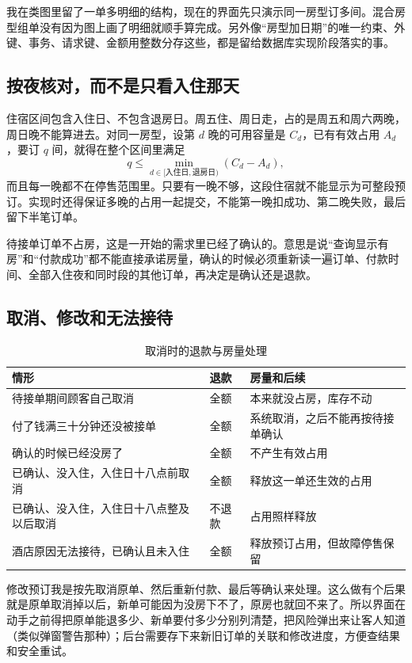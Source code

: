 \documentclass[UTF8,a4paper,zihao=-4,fontset=none]{ctexart}
\begin{document}
我在类图里留了一单多明细的结构，现在的界面先只演示同一房型订多间。混合房型组单没有因为图上画了明细就顺手算完成。另外像“房型加日期”的唯一约束、外键、事务、请求键、金额用整数分存这些，都是留给数据库实现阶段落实的事。

\subsection{按夜核对，而不是只看入住那天}
住宿区间包含入住日、不包含退房日。周五住、周日走，占的是周五和周六两晚，周日晚不能算进去。对同一房型，设第 $d$ 晚的可用容量是 $C_d$，已有有效占用 $A_d$，要订 $q$ 间，就得在整个区间里满足
\[
q\leq\min_{d\in[\text{入住日},\text{退房日})}(C_d-A_d),
\]
而且每一晚都不在停售范围里。只要有一晚不够，这段住宿就不能显示为可整段预订。实现时还得保证多晚的占用一起提交，不能第一晚扣成功、第二晚失败，最后留下半笔订单。

待接单订单不占房，这是一开始的需求里已经了确认的。意思是说“查询显示有房”和“付款成功”都不能直接承诺房量，确认的时候必须重新读一遍订单、付款时间、全部入住夜和同时段的其他订单，再决定是确认还是退款。

\subsection{取消、修改和无法接待}
\begin{table}[H]\centering\small
\caption{取消时的退款与房量处理}
\begin{tabularx}{\linewidth}{p{52mm}p{29mm}Y}\toprule
情形&退款&房量和后续\\\midrule
待接单期间顾客自己取消&全额&本来就没占房，库存不动\\
付了钱满三十分钟还没被接单&全额&系统取消，之后不能再按待接单确认\\
确认的时候已经没房了&全额&不产生有效占用\\
已确认、没入住，入住日十八点前取消&全额&释放这一单还生效的占用\\
已确认、没入住，入住日十八点整及以后取消&不退款&占用照样释放\\
酒店原因无法接待，已确认且未入住&全额&释放预订占用，但故障停售保留\\\bottomrule
\end{tabularx}\end{table}

修改预订我是按先取消原单、然后重新付款、最后等确认来处理。这么做有个后果就是原单取消掉以后，新单可能因为没房下不了，原房也就回不来了。所以界面在动手之前得把原单能退多少、新单要付多少分别列清楚，把风险弹出来让客人知道（类似弹窗警告那种）；后台需要存下来新旧订单的关联和修改进度，方便查结果和安全重试。
\end{document}
